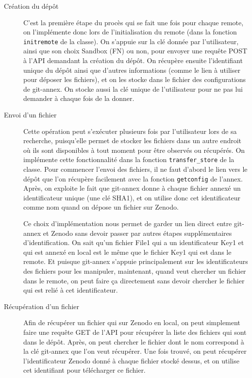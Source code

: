 \documentclass[11pt]{article}
\begin{document}
\begin{description}
\item[{Création du dépôt}] C'est la première étape du procès qui se fait une fois pour chaque
remote, on l'implémente donc lors de l'initialisation du remote
(dans la fonction \texttt{initremote} de la classe). On s'appuie sur la clé
donnée par l'utilisateur, ainsi que son choix Sandbox (FN) ou non,
pour envoyer une requête POST à l'API demandant la création du
dépôt. On récupère ensuite l'identifiant unique du dépôt ainsi que
d'autres informations (comme le lien à utiliser pour déposer les
fichiers), et on les stocke dans le fichier des configurations de
git-annex. On stocke aussi la clé unique de l'utilisateur pour ne
pas lui demander à chaque fois de la donner.

\item[{Envoi d'un fichier}] Cette opération peut s'exécuter plusieurs fois par l'utilisateur
lors de sa recherche, puisqu'elle permet de stocker les fichiers
dans un autre endroit où ils sont disponibles à tout moment pour
être observés ou récupérés. On implémente cette fonctionnalité dans
la fonction \texttt{transfer\_store} de la classe.
Pour commencer l'envoi des fichiers, il ne faut d'abord le lien vers
le dépôt que l'on récupère facilement avec la fonction \texttt{getconfig} de
l'annex. Après, on exploite le fait que git-annex donne à chaque
fichier annexé un identificateur unique (une clé SHA1), et on
utilise donc cet identificateur comme nom quand on dépose un fichier
sur Zenodo.

Ce choix d'implémentation nous permet de garder un lien
direct entre git-annex et Zenodo sans devoir passer par autres
étapes supplémentaires d'identification. On sait qu'un fichier File1
qui a un identificateur Key1 et qui est annexé en local est le même
que le fichier Key1 qui est dans le remote. Et puisque git-annex
s'appuie principalement sur les identificateurs des fichiers pour
les manipuler, maintenant, quand veut chercher un fichier dans le
remote, on peut faire ça directement sans devoir chercher le fichier
qui est relié à cet identificateur.

\item[{Récupération d'un fichier}] Afin de récupérer un fichier qui sur Zenodo en local, on peut
simplement faire une requête GET de l'API pour récupérer la liste
des fichiers qui sont dans le dépôt. Après, on peut chercher le
fichier dont le nom correspond à la clé git-annex que l'on veut
récupérer. Une fois trouvé, on peut récupérer l'identificateur
Zenodo donné à chaque fichier stocké dessus, et on utilise cet
identifiant pour télécharger ce fichier.


\end{description}
\end{document}
